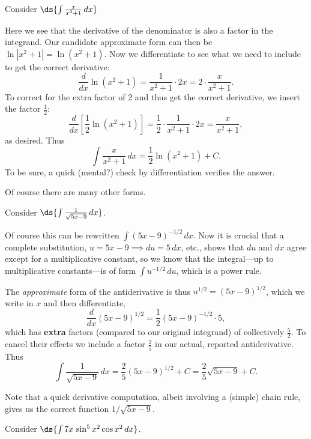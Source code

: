 \bex Consider $\ds{\int\frac{x}{x^2+1}\,dx}$

Here we see that the derivative of the denominator is also a factor
in the integrand.
Our candidate approximate form can then be $\ln|x^2+1|=\ln(x^2+1)$.
Now we differentiate to see what we need to include to get the
correct derivative:
$$\frac{d}{dx}\ln(x^2+1)=\frac1{x^2+1}\cdot2x=2\cdot\frac{x}{x^2+1}.$$
To correct for the extra factor of 2 and thus get the correct derivative,
we insert the factor $\frac12$:
$$\frac{d}{dx}\left[\frac12\ln(x^2+1)\right]
 =\frac12\cdot\frac1{x^2+1}\cdot2x=\frac{x}{x^2+1},$$
as desired.  Thus 
$$\int\frac{x}{x^2+1}\,dx=\frac12\ln(x^2+1)+C.$$
To be sure, a quick (mental?) check by differentiation verifies the answer.
\eex

Of course there are many other forms.


\bex Consider $\ds{\int\frac1{\sqrt{5x-9}}\,dx}$.

Of course this can be rewritten
$\int(5x-9)^{-1/2}\,dx$.  Now it is crucial that a
complete substitution, $u=5x-9\implies du=5\,dx$, etc., 
shows that $du$ and $dx$ agree except for a multiplicative
constant, so we know that the integral---up to multiplicative
constants---is of form $\int u^{-1/2}\,du$, which is a power rule.

The {\it approximate} form of the antiderivative is thus
$u^{1/2}=(5x-9)^{1/2}$,  which we write in $x$ and then differentiate,
$$\frac{d}{dx}(5x-9)^{1/2}=\frac12(5x-9)^{-1/2}\cdot5,$$
which has {\bf extra} factors (compared to our original integrand)
of collectively  $\frac52$. To cancel their effects we
include a factor $\frac25$ in our actual, reported  antiderivative.
Thus
$$\int\frac1{\sqrt{5x-9}}\,dx=\frac25(5x-9)^{1/2}+C=\frac25\sqrt{5x-9}+C.$$
\eex

Note that a quick derivative computation, albeit involving a
(simple) chain rule, gives us the correct function $1/\sqrt{5x-9}$. 

\bex Consider $\ds{\int 7x\,\sin^5x^2\cos x^2\,dx}$.

